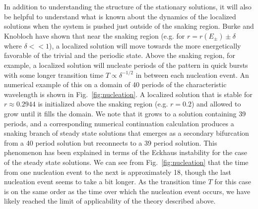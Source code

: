 \documentclass[pre,preprint,superscriptaddress]{revtex4-1}
\begin{document}
In addition to understanding the structure of the stationary solutions, it will also be helpful to understand what is known about the dynamics of the localized solutions when the system is pushed just outside of the snaking region.  Burke and Knobloch \cite{burke2006} have shown that near the snaking region (e.g. for $r=r(E_{\pm})\pm\delta$ where $\delta <<1$), a localized solution will move towards the more energetically favorable of the trivial and the periodic state.  Above the snaking region, for example, a localized solution will nucleate periods of the pattern in quick bursts with some longer transition time $T\propto \delta^{-1/2}$ in between each nucleation event.  An numerical example of this on a domain of 40 periods of the characteristic wavelength is shown in Fig.~\ref{fig:nucleation}.  A localized solution that is stable for $r\approx 0.2944$ is initialized above the snaking region (e.g. $r=0.2$) and allowed to grow until it fills the domain. We note that it grows to a solution containing 39 periods, and a corresponding numerical continuation calculation produces a snaking branch of steady state solutions that emerges as a secondary bifurcation from a 40 period solution but reconnects to a 39 period solution.  This phenomenon has been explained \cite{bergeon2008} in terms of the Eckhaus instability for the case of the steady state solutions.  We can see from Fig.~\ref{fig:nucleation} that the time from one nucleation event to the next is approximately 18, though the last nucleation event seems to take a bit longer.  As the transition time $T$ for this case is on the same order as the time over which the nucleation event occurs, we have likely reached the limit of applicability of the theory described above.
\end{document}
